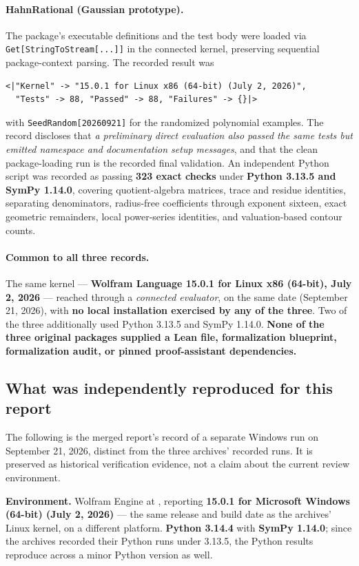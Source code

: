 \documentclass[11pt,letterpaper]{article}
\numberwithin{equation}{section}
\theoremstyle{definition}
\theoremstyle{remark}
\begin{document}
\paragraph{HahnRational (Gaussian prototype).}
The package's executable definitions and the test body were loaded via
\texttt{Get[StringToStream[...]]} in the connected kernel, preserving sequential
package-context parsing. The recorded result was
\begin{lstlisting}
<|"Kernel" -> "15.0.1 for Linux x86 (64-bit) (July 2, 2026)",
  "Tests" -> 88, "Passed" -> 88, "Failures" -> {}|>
\end{lstlisting}
with \texttt{SeedRandom[20260921]} for the randomized polynomial examples. The
record discloses that \emph{a preliminary direct evaluation also passed the same
tests but emitted namespace and documentation setup messages}, and that the
clean package-loading run is the recorded final validation. An independent
Python script was recorded as passing \textbf{323 exact checks} under
\textbf{Python 3.13.5 and SymPy 1.14.0}, covering quotient-algebra matrices,
trace and residue identities, separating denominators, radius-free coefficients
through exponent sixteen, exact geometric remainders, local power-series
identities, and valuation-based contour counts.

\paragraph{Common to all three records.}
The same kernel --- \textbf{Wolfram Language 15.0.1 for Linux x86 (64-bit),
July 2, 2026} --- reached through a \emph{connected evaluator}, on the same date
(September 21, 2026), with \textbf{no local installation exercised by any of the
three}. Two of the three additionally used Python 3.13.5 and SymPy 1.14.0.
\textbf{None of the three original packages supplied a Lean file, formalization
blueprint, formalization audit, or pinned proof-assistant dependencies.}

\subsection{What was independently reproduced for this report}
\label{cas:sub-reproduced}
The following is the merged report's record of a separate Windows run on
September 21, 2026, distinct from the three archives' recorded runs. It is
preserved as historical verification evidence, not a claim about the current
review environment.

\textbf{Environment.} Wolfram Engine at
,
reporting \textbf{15.0.1 for Microsoft Windows (64-bit) (July 2, 2026)} --- the
same release and build date as the archives' Linux kernel, on a different
platform. \textbf{Python 3.14.4} with \textbf{SymPy 1.14.0}; since the archives
recorded their Python runs under 3.13.5, the Python results reproduce across a
minor Python version as well.
\end{document}
